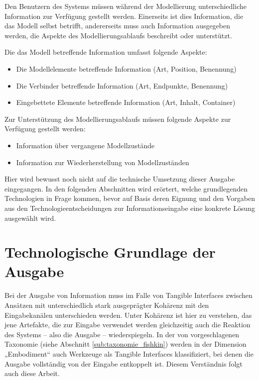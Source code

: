 Den Benutzern des Systems müssen während der Modellierung unterschiedliche Information zur Verfügung gestellt werden. Einerseits ist dies Information, die das Modell selbst betrifft, andererseits muss auch Information ausgegeben werden, die Aspekte des Modellierungsablaufs beschreibt oder unterstützt.

Die das Modell betreffende Information umfasst folgende Aspekte:
\begin{itemize}
 \item Die Modellelemente betreffende Information (Art, Position, Benennung)
 \item Die Verbinder betreffende Information (Art, Endpunkte, Benennung)
 \item Eingebettete Elemente betreffende Information (Art, Inhalt, Container)
\end{itemize}

Zur Unterstützung des Modellierungsablaufs müssen folgende Aspekte zur Verfügung gestellt werden:
\begin{itemize}
 \item Information über vergangene Modellzustände
 \item Information zur Wiederherstellung von Modellzuständen
\end{itemize}

Hier wird bewusst noch nicht auf die technische Umsetzung dieser Ausgabe eingegangen. In den folgenden Abschnitten wird erörtert, welche grundlegenden Technologien in Frage kommen, bevor auf Basis deren Eignung und den Vorgaben aus den Technologieentscheidungen zur Informationseingabe eine konkrete Lösung ausgewählt wird.


\section{Technologische Grundlage der Ausgabe} %
\label{sec:technologische_grundlage_der_visualisierung}

Bei der Ausgabe von Information muss im Falle von Tangible Interfaces zwischen Ansätzen mit unterschiedlich stark ausgeprägter Kohärenz mit den Eingabekanälen unterschieden werden. Unter Kohärenz ist hier zu verstehen, das jene Artefakte, die zur Eingabe verwendet werden gleichzeitig auch die Reaktion des Systems -- also die Ausgabe -- wiederspiegeln. In der von \citet{Fishkin04} vorgeschlagenen Taxonomie (siehe Abschnitt \ref{sub:taxonomie_fishkin}) werden in der Dimension „Embodiment“ auch Werkzeuge als Tangible Interfaces klassifiziert, bei denen die Ausgabe vollständig von der Eingabe entkoppelt ist. Diesem Verständnis folgt auch diese Arbeit.

